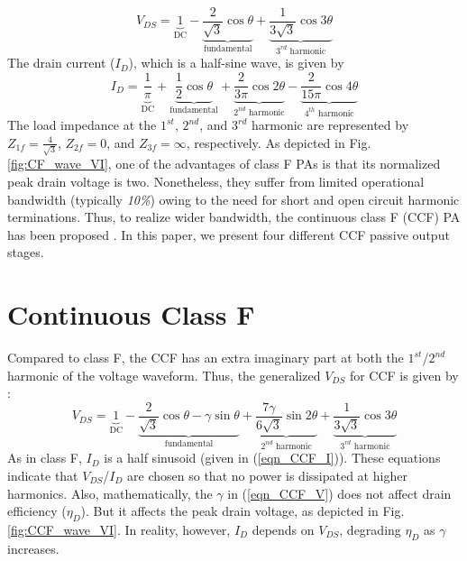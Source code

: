 \documentclass[conference]{IEEEtran}
\begin{document}
\begin{equation}
V_{DS}=\underbrace{1}_{\text{DC}}-\underbrace{\frac{2}{\sqrt{3}} \cos \theta}_{\text{fundamental}}+\underbrace{\frac{1}{3 \sqrt{3}} \cos 3 \theta}_{\text{$3^{rd}$ harmonic}}
\label{eqn_CF_V}
\end{equation}
The drain current ($I_{D}$), which is a half-sine wave, is given by
\begin{equation}
I_{D}=\underbrace{\frac{1}{\pi}}_{\text{DC}}+\underbrace{\frac{1}{2} \cos \theta}_{\text{fundamental}}+\underbrace{\frac{2}{3 \pi} \cos 2 \theta}_{\text{$2^{nd}$ harmonic}}-\underbrace{\frac{2}{15 \pi} \cos 4 \theta}_{\text{$4^{th}$ harmonic}}
\label{eqn_CCF_I}
\end{equation}
The load impedance at the  $1^{st}$, $2^{nd}$, and $3^{rd}$ harmonic are represented by $Z_{1f}=\frac{4}{\sqrt{3}}$, $Z_{2f}=0$, and $Z_{3f}=\infty$, respectively. As depicted in Fig. \ref{fig:CF_wave_VI},  one of the advantages of class F PAs is that its normalized peak drain voltage is two. Nonetheless, they suffer from limited operational bandwidth (typically \textit{10\%}) owing to the need for short and open circuit harmonic terminations. Thus, to realize wider bandwidth, the continuous class F (CCF) PA has been proposed \cite{CCF_reason}. In this paper, we present four different CCF passive output stages. 

\section{Continuous Class F}
\label{section:CCF}
\vspace{-0.05in}
Compared to class F, the CCF has an extra imaginary part at both the $1^{st}$/$2^{nd}$ harmonic of the voltage waveform. Thus, the generalized $V_{DS}$ for CCF is given by \cite{ECCF_Carrubba}:
\begin{equation}
V_{DS}=\underbrace{1}_{\text{DC}}-\underbrace{\frac{2}{\sqrt{3}} \cos \theta-\gamma \sin \theta}_{\text{fundamental}}+\underbrace{\frac{7 \gamma}{6 \sqrt{3}} \sin 2 \theta}_{\text{$2^{nd}$ harmonic}}+\underbrace{\frac{1}{3 \sqrt{3}} \cos 3 \theta}_{\text{$3^{rd}$ harmonic}}
\label{eqn_CCF_V}
\end{equation}
As in class F, $I_{D}$ is a half sinusoid (given in (\ref{eqn_CCF_I})). These equations indicate that $V_{DS}$/$I_{D}$ are chosen so that no power is dissipated at higher harmonics. Also, mathematically, the $\gamma$ in (\ref{eqn_CCF_V}) does not affect drain efficiency ($\eta_D$). But it affects the peak drain voltage, as depicted in Fig. \ref{fig:CCF_wave_VI}. In reality, however, $I_{D}$ depends on $V_{DS}$, degrading $\eta_D$ as $\gamma$ increases.
\end{document}
